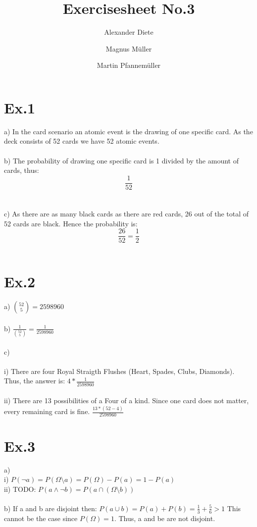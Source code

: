 \documentclass[11pt]{article}
\title{Exercisesheet No.3}
\author{Alexander Diete \and Magnus M\"uller \and Martin Pfannem\"uller}
\begin{document}
\maketitle

\section*{Ex.1}

a)
In the card scenario an atomic event is the drawing of one specific card. As the deck consists of 52 cards we have 52 atomic events. \\
\\
b) The probability of drawing one specific card is 1 divided by the amount of cards, thus: 
$$\frac{1}{52}$$ \\
\\
c)
As there are as many black cards as there are red cards, 26 out of the total of 52 cards are black. Hence the probability is:
$$\frac{26}{52} = \frac{1}{2}$$ \\

\section*{Ex.2}

a) $\binom{52}{5} = 2598960$ \\
\\
b) $\frac{1}{\binom{52}{5}} = \frac{1}{2598960}$ \\
\\
c) \\
\\
i) There are four Royal Straigth Flushes (Heart, Spades, Clubs, Diamonds). Thus, the answer is: $4 * \frac{1}{2598960}$ \\
\\
ii) There are 13 possibilities of a Four of a kind. Since one card does not matter, every remaining card is fine. $\frac{13*(52-4)}{2598960}$

\section*{Ex.3}
a)\\
i) $P(\neg a) = P(\Omega \setminus a) = P(\Omega) - P(a) = 1 - P(a)$ \\
ii) TODO:  $P(a \wedge \neg b) = P(a \cap (\Omega \setminus b))$ \\
\\
b) If a and b are disjoint then: $P(a \cup b) = P(a) + P(b) = \frac{1}{3} + \frac{5}{6} > 1$ This cannot be the case since $P(\Omega) = 1$. Thus, a and be are not disjoint. \\
\end{document}
